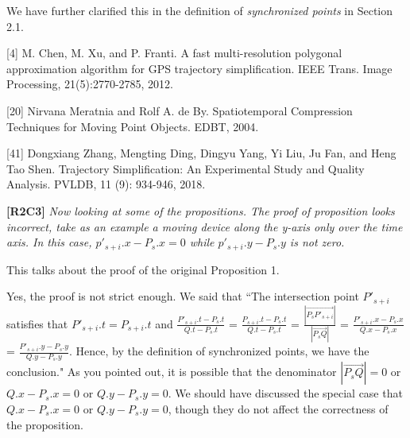 \documentclass{letter}
\begin{document}
We have further clarified this in the definition of \emph{synchronized points} in Section 2.1.




[4] M. Chen, M. Xu, and P. Franti. A fast multi-resolution polygonal approximation algorithm for GPS trajectory
simplification. IEEE Trans. Image Processing, 21(5):2770-2785, 2012.

[20] Nirvana Meratnia and Rolf A. de By. Spatiotemporal Compression Techniques for Moving Point Objects. EDBT, 2004.

[41] Dongxiang Zhang, Mengting Ding, Dingyu Yang, Yi Liu, Ju Fan, and Heng Tao Shen. Trajectory Simplification: An Experimental Study and Quality Analysis. PVLDB, 11 (9): 934-946, 2018.







\textbf{[R2C3]} \emph{Now looking at some of the propositions.
The proof of proposition looks incorrect, take as an example a moving device along the y-axis only over the time axis. In this case, $p'_{s+i}.x - P_s.x = 0$ while $p'_{s+i}.y - P_s.y$ is not zero.
}

This talks about the proof of the original Proposition 1.

Yes, the proof is not strict enough. We said that
``The intersection point $P'_{s+i}$ satisfies that $P'_{s+i}.t = P_{s+i}.t$ and
$\frac{P'_{s+i}.t - P_{s}.t}{Q.t - P_{s}.t}$ = $\frac{P_{s+i}.t - P_{s}.t}{Q.t - P_{s}.t}$  =
$\frac{|\overrightarrow{P_sP'_{s+i}}|}{|\overrightarrow{P_sQ}|}$ =
$\frac{P'_{s+i}.x - P_{s}.x}{Q.x - P_{s}.x}$ =
$\frac{P'_{s+i}.y - P_{s}.y}{Q.y - P_{s}.y}$.
Hence, by the definition of synchronized points, we have the conclusion."
As you pointed out, it is possible that the denominator $|\overrightarrow{P_sQ}|=0$ or $Q.x - P_{s}.x=0$ or $Q.y - P_{s}.y=0$. We should have discussed the special case that $Q.x - P_{s}.x=0$ or $Q.y - P_{s}.y=0$, though they do not affect the correctness of the proposition.
\end{document}
